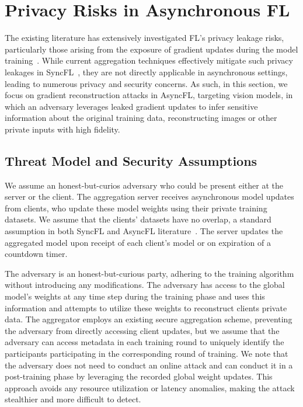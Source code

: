 \section{Privacy Risks in Asynchronous FL}
\label{sec03} 
The existing literature has extensively investigated FL's privacy leakage risks, particularly those arising from the exposure of gradient updates during the model training~\cite{picromveg2023Perfectly,pasfraate2022Eluding,ZhaShaElk2024Large-scale,melsondec2019exploiting}. While current aggregation techniques effectively mitigate such privacy leakages in SyncFL~\cite{NaHyeJun2022Closing,liuligao2023privacy-encoded,weilima2023personalized,HuGuoGon2023Federated}, they are not directly applicable in asynchronous settings, leading to numerous privacy and security concerns. 
As such, in this section, we focus on gradient reconstruction attacks in AsyncFL, targeting vision models, in which an adversary leverages leaked gradient updates to infer sensitive information about the original training data, reconstructing images or other private inputs with high fidelity.
\subsection{Threat Model and Security Assumptions}
\label{subsec03-01}
We assume an honest-but-curios adversary who could be present either at the server or the client. 
The aggregation server receives asynchronous model updates from clients, who update these model weights using their private training datasets. We assume that the clients' datasets have no overlap, a standard assumption in both SyncFL and AsyncFL literature~\cite{CheNinYue20,Mam21}. The server updates the aggregated model upon receipt of each client's model or on expiration of a countdown timer. 

The adversary is an honest-but-curious party, adhering to the training algorithm without introducing any modifications. The adversary has access to the global model's weights at any time step during the training phase and uses this information and attempts to utilize these weights to reconstruct clients private data. The aggregator employs an existing secure aggregation scheme, preventing the adversary from directly accessing client updates, but we assume that the adversary can access metadata in each training round to uniquely identify the participants participating in the corresponding round of training. 
We note that the adversary does not need to conduct an online attack and can conduct it in a post-training phase by leveraging the recorded global weight updates. This approach avoids any resource utilization or latency anomalies, making the attack stealthier and more difficult to detect.

